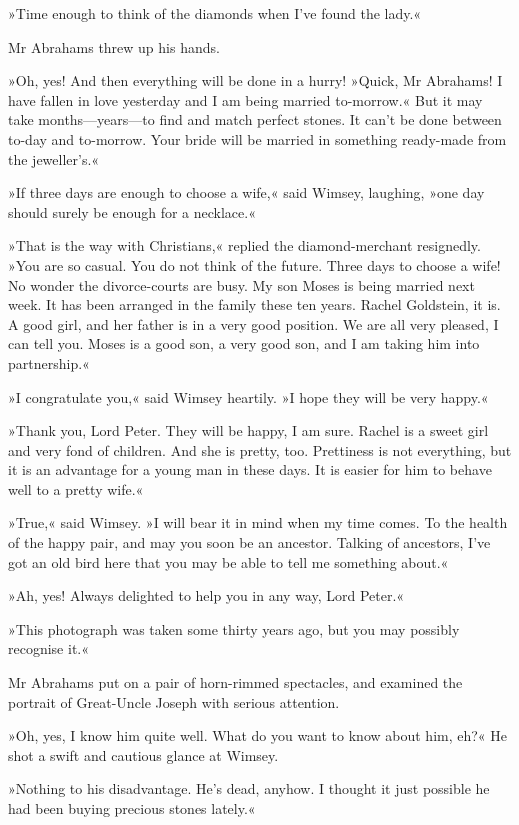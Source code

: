 »Time enough to think of the diamonds when I've found the lady.«

Mr Abrahams threw up his hands.

»Oh, yes! And then everything will be done in a hurry! »Quick, Mr Abrahams! I have fallen in love yesterday and I am being married to-morrow.« But it may take months—years—to find and match perfect stones. It can't be done between to-day and to-morrow. Your bride will be married in something ready-made from the jeweller's.«

»If three days are enough to choose a wife,« said Wimsey, laughing, »one day should surely be enough for a necklace.«

»That is the way with Christians,« replied the diamond-merchant resignedly. »You are so casual. You do not think of the future. Three days to choose a wife! No wonder the divorce-courts are busy. My son Moses is being married next week. It has been arranged in the family these ten years. Rachel Goldstein, it is. A good girl, and her father is in a very good position. We are all very pleased, I can tell you. Moses is a good son, a very good son, and I am taking him into partnership.«

»I congratulate you,« said Wimsey heartily. »I hope they will be very happy.«

»Thank you, Lord Peter. They will be happy, I am sure. Rachel is a sweet girl and very fond of children. And she is pretty, too. Prettiness is not everything, but it is an advantage for a young man in these days. It is easier for him to behave well to a pretty wife.«

»True,« said Wimsey. »I will bear it in mind when my time comes. To the health of the happy pair, and may you soon be an ancestor. Talking of ancestors, I've got an old bird here that you may be able to tell me something about.«

»Ah, yes! Always delighted to help you in any way, Lord Peter.«

»This photograph was taken some thirty years ago, but you may possibly recognise it.«

Mr Abrahams put on a pair of horn-rimmed spectacles, and examined the portrait of Great-Uncle Joseph with serious attention.

»Oh, yes, I know him quite well. What do you want to know about him, eh?« He shot a swift and cautious glance at Wimsey.

»Nothing to his disadvantage. He's dead, anyhow. I thought it just possible he had been buying precious stones lately.«

